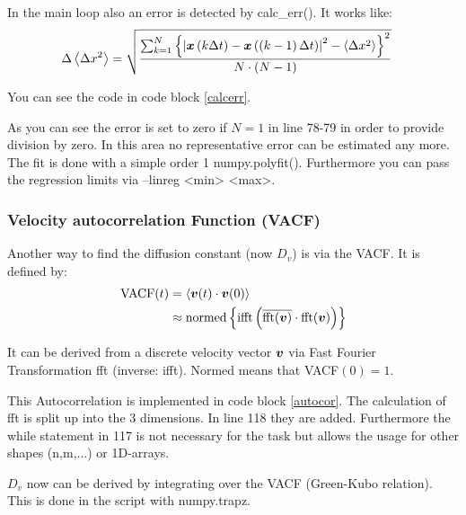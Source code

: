 In the main loop also an error is detected by calc\_err().
It works like:
\begin{align}
\Delta \left\langle \Delta x^2\right\rangle
	&=\sqrt{\frac{
		\sum_{k=1}^{N}\left\lbrace\left| \boldsymbol{x}\left( k\Delta t\right) - \boldsymbol{x}\left(\left( k-1\right)\Delta t\right)\right|^2 
		- \left\langle \Delta x^2\right\rangle\right\rbrace ^2}{N\cdot\left( N-1\right)}}
\end{align}

You can see the code in code block \ref{calcerr}.
 

As you can see the error is set to zero if $N=1$ in line 78-79 in order to provide division by zero.
In this area no representative error can be estimated any more.\\

The fit is done with a simple order 1 numpy.polyfit().
Furthermore you can pass the regression limits via --linreg <min> <max>.


\subsubsection{Velocity autocorrelation Function (VACF)}

Another way to find the diffusion constant (now $D_v$) is via the VACF.
It is defined by:
\begin{align}
\text{VACF}(t)
	&=\left\langle \boldsymbol{v}(t) \cdot \boldsymbol{v}(0) \right\rangle 
	\label{vacf}\\
	&\approx \text{normed}\left\lbrace\text{ifft}\left( \overline{\text{fft}(\boldsymbol{v})} \cdot \text{fft}(\boldsymbol{v})\right)\right\rbrace\label{fft}
\end{align}

It can be derived from a discrete velocity vector $\boldsymbol{v}$ via Fast Fourier Transformation fft (inverse: ifft).
Normed means that VACF$(0) = 1$.

This Autocorrelation is implemented in code block \ref{autocor}.
The calculation of fft is split up into the 3 dimensions. 
In line 118 they are added.
Furthermore the while statement in 117 is not necessary for the task but allows the usage for other shapes (n,m,...) or 1D-arrays.


$D_v$ now can be derived by integrating over the VACF (Green-Kubo relation).
This is done in the script with numpy.trapz.

